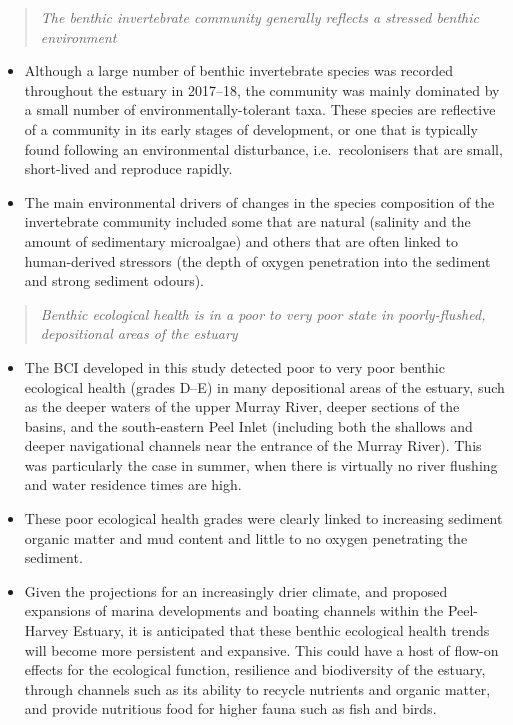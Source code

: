 \documentclass[
]{book}
\begin{document}
\begin{quote}
\emph{The benthic invertebrate community generally reflects a stressed benthic environment}
\end{quote}

\begin{itemize}
\item
  Although a large number of benthic invertebrate species was recorded throughout the estuary in 2017--18, the community was mainly dominated by a small number of environmentally-tolerant taxa. These species are reflective of a community in its early stages of development, or one that is typically found following an environmental disturbance, i.e.~recolonisers that are small, short-lived and reproduce rapidly.
\item
  The main environmental drivers of changes in the species composition of the invertebrate community included some that are natural (salinity and the amount of sedimentary microalgae) and others that are often linked to human-derived stressors (the depth of oxygen penetration into the sediment and strong sediment odours).
\end{itemize}

\begin{quote}
\emph{Benthic ecological health is in a poor to very poor state in poorly-flushed, depositional areas of the estuary}
\end{quote}

\begin{itemize}
\item
  The BCI developed in this study detected poor to very poor benthic ecological health (grades D--E) in many depositional areas of the estuary, such as the deeper waters of the upper Murray River, deeper sections of the basins, and the south-eastern Peel Inlet (including both the shallows and deeper navigational channels near the entrance of the Murray River). This was particularly the case in summer, when there is virtually no river flushing and water residence times are high.
\item
  These poor ecological health grades were clearly linked to increasing sediment organic matter and mud content and little to no oxygen penetrating the sediment.
\item
  Given the projections for an increasingly drier climate, and proposed expansions of marina developments and boating channels within the Peel-Harvey Estuary, it is anticipated that these benthic ecological health trends will become more persistent and expansive. This could have a host of flow-on effects for the ecological function, resilience and biodiversity of the estuary, through channels such as its ability to recycle nutrients and organic matter, and provide nutritious food for higher fauna such as fish and birds.
\end{itemize}
\end{document}
